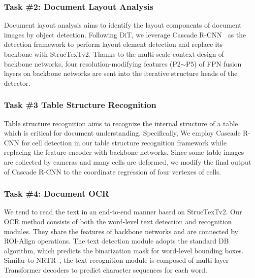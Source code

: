 \documentclass{article} %
\begin{document}
\subsubsection{Task \#2: Document Layout Analysis}
Document layout analysis aims to identify the layout components of document images by object detection. Following DiT, we leverage Cascade R-CNN~\cite{cai2018cascade} as the detection framework to perform layout element detection and replace its backbone with StrucTexTv2. Thanks to the multi-scale context design of backbone networks, four resolution-modifying features (P2$\sim$P5) of FPN fusion layers on backbone networks are sent into the iterative structure heads of the detector.

\subsubsection{Task \#3 Table Structure Recognition}
Table structure recognition aims to recognize the internal structure of a table which is critical for document understanding. Specifically, We employ Cascade R-CNN for cell detection in our table structure recognition framework while replacing the feature encoder with backbone networks. Since some table images are collected by cameras and many cells are deformed, we modify the final output of Cascade R-CNN to the coordinate regression of four vertexes of cells.

\subsubsection{Task \#4: Document OCR}
We tend to read the text in an end-to-end manner based on StrucTexTv2.
Our OCR method consists of both the word-level text detection and recognition modules. They share the features of backbone networks and are connected by ROI-Align operations. The text detection module adopts the standard DB~\cite{liao2020real} algorithm, which predicts the binarization mask for word-level bounding boxes. Similar to NRTR~\cite{sheng2019nrtr}, the text recognition module is composed of multi-layer Transformer decoders to predict character sequences for each word.
\end{document}

